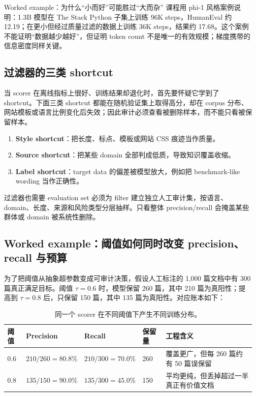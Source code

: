 \begin{knowledgebox}{Worked example：为什么“小而好”可能胜过“大而杂”}
课程用 phi-1 风格案例说明：1.3B 模型在 The Stack Python 子集上训练 96K steps，HumanEval 约 12.19；在更小但经过质量过滤的数据上训练 36K steps，结果约 17.68。这个案例不能证明“数据越少越好”，但证明 token count 不是唯一的有效规模；梯度携带的信息密度同样关键。
\end{knowledgebox}

\subsection{过滤器的三类 shortcut}

当 scorer 在离线指标上很好、训练结果却退化时，首先要怀疑它学到了 shortcut。下面三类 shortcut 都能在随机验证集上取得高分，却在 corpus 分布、网站模板或语言比例变化后失效；因此审计必须查看被删除样本，而不能只看被保留样本。

\begin{enumerate}
\item \textbf{Style shortcut}：把长度、标点、模板或网站 CSS 痕迹当作质量。
\item \textbf{Source shortcut}：把某些 domain 全部判成低质，导致知识覆盖收缩。
\item \textbf{Label shortcut}：target data 的偏差被模型放大，例如把 benchmark-like wording 当作正确性。
\end{enumerate}

\begin{warningbox}{过滤器也需要 evaluation set}
必须为 filter 建立独立人工审计集，按语言、domain、长度、来源和风险类型分层抽样。只看整体 precision/recall 会掩盖某些群体或 domain 被系统性删除。
\end{warningbox}

\subsection{Worked example：阈值如何同时改变 precision、recall 与预算}

为了把阈值从抽象超参数变成可审计决策，假设人工标注的 1,000 篇文档中有 300 篇真正满足目标。阈值 $\tau=0.6$ 时，模型保留 260 篇，其中 210 篇为真阳性；提高到 $\tau=0.8$ 后，只保留 150 篇，其中 135 篇为真阳性。对应账本如下：

\begin{table}[H]
\centering
\begin{tabular}{L{0.15\textwidth}L{0.14\textwidth}L{0.14\textwidth}L{0.13\textwidth}L{0.24\textwidth}}
\toprule
阈值 & Precision & Recall & 保留量 & 工程含义 \\
\midrule
$0.6$ & $210/260=80.8\%$ & $210/300=70.0\%$ & 260 & 覆盖更广，但每 260 篇约有 50 篇误保留 \\
$0.8$ & $135/150=90.0\%$ & $135/300=45.0\%$ & 150 & 平均更纯，但丢掉超过一半真正有价值文档 \\
\bottomrule
\end{tabular}
\caption{同一个 scorer 在不同阈值下产生不同训练分布。}
\end{table}

